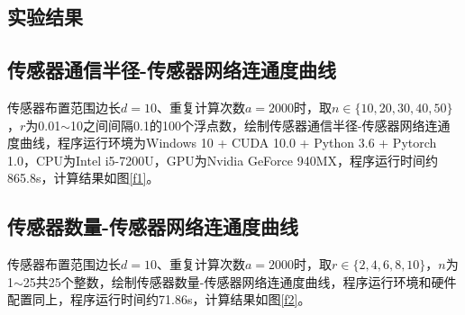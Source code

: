 \documentclass[a4paper]{ctexart}
\begin{document}
\begin{spacing}{1}
\section{实验结果}
\subsection{传感器通信半径-传感器网络连通度曲线}
传感器布置范围边长$d=10$、重复计算次数$a=2000$时，取$n\in\{10,20,30,40,50\}$，$r$为0.01$\sim$10之间间隔0.1的100个浮点数，绘制传感器通信半径-传感器网络连通度曲线，程序运行环境为Windows 10 + CUDA 10.0 + Python 3.6 + Pytorch 1.0，CPU为Intel i5-7200U，GPU为Nvidia GeForce 940MX，程序运行时间约865.8s，计算结果如图\ref{f1}。

\subsection{传感器数量-传感器网络连通度曲线}
传感器布置范围边长$d=10$、重复计算次数$a=2000$时，取$r\in\{2,4,6,8,10\}$，$n$为1$\sim$25共25个整数，绘制传感器数量-传感器网络连通度曲线，程序运行环境和硬件配置同上，程序运行时间约71.86s，计算结果如图\ref{f2}。


\end{spacing}
\end{document}
